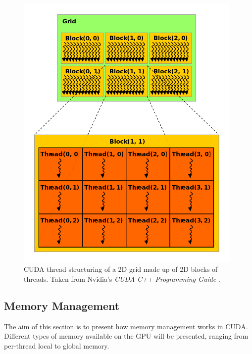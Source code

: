 \begin{figure}[h!]
	\centering
	\includegraphics[width=11cm, keepaspectratio]{images/ch1/nvidia_grid_block_thread.png}
	\caption{CUDA thread structuring of a 2D grid made up of 2D blocks of threads. Taken from Nvidia's \emph{CUDA C++ Programming Guide} \cite{NVIDIAMay2022}.}
	\label{Figure:CUDA-grid-block-thread}
\end{figure}


\subsection{Memory Management}\label{Subsection:memory-management}
The aim of this section is to present how memory management works in CUDA. Different types of memory available on the GPU will be presented, ranging from per-thread local to global memory.

